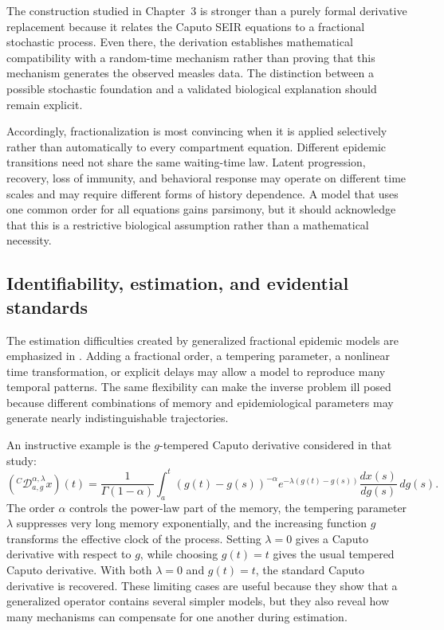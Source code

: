 \documentclass[00-main.tex]{subfiles}
\begin{document}
The construction studied in Chapter~3 is stronger than a purely formal derivative replacement because it relates the Caputo SEIR equations to a fractional stochastic process.
Even there, the derivation establishes mathematical compatibility with a random-time mechanism rather than proving that this mechanism generates the observed measles data.
The distinction between a possible stochastic foundation and a validated biological explanation should remain explicit.

Accordingly, fractionalization is most convincing when it is applied selectively rather than automatically to every compartment equation.
Different epidemic transitions need not share the same waiting-time law.
Latent progression, recovery, loss of immunity, and behavioral response may operate on different time scales and may require different forms of history dependence.
A model that uses one common order for all equations gains parsimony, but it should acknowledge that this is a restrictive biological assumption rather than a mathematical necessity.

\subsection{Identifiability, estimation, and evidential standards}

The estimation difficulties created by generalized fractional epidemic models are emphasized in \cite{Ci26}.
Adding a fractional order, a tempering parameter, a nonlinear time transformation, or explicit delays may allow a model to reproduce many temporal patterns.
The same flexibility can make the inverse problem ill posed because different combinations of memory and epidemiological parameters may generate nearly indistinguishable trajectories.

An instructive example is the $g$-tempered Caputo derivative considered in that study:
\[
({}^{C}\mathcal{D}_{a,g}^{\alpha,\lambda}x)(t)
=\frac{1}{\Gamma(1-\alpha)}
\int_a^t
(g(t)-g(s))^{-\alpha}
e^{-\lambda(g(t)-g(s))}
\frac{dx(s)}{dg(s)}\,dg(s).
\]
The order $\alpha$ controls the power-law part of the memory, the tempering parameter $\lambda$ suppresses very long memory exponentially, and the increasing function $g$ transforms the effective clock of the process.
Setting $\lambda=0$ gives a Caputo derivative with respect to $g$, while choosing $g(t)=t$ gives the usual tempered Caputo derivative.
With both $\lambda=0$ and $g(t)=t$, the standard Caputo derivative is recovered.
These limiting cases are useful because they show that a generalized operator contains several simpler models, but they also reveal how many mechanisms can compensate for one another during estimation.
\end{document}
